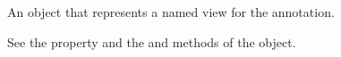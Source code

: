 \documentclass[letterpaper,12pt,english,openany,oneside]{sphinxmanual}
\begin{document}
An object that represents a named view for the annotation.

See the  property and the  and  methods of the  object.

\label{\detokenize{JS_3D_API:properties-35}}

\label{\detokenize{JS_3D_API:section-144}}


\renewcommand{\indexname}{Index}
\printindex
\end{document}
